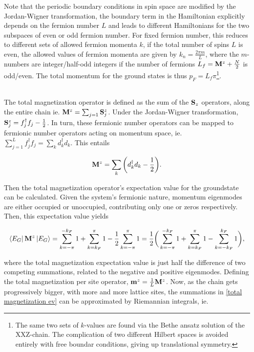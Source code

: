 \documentclass{homework}
\begin{document}
Note that the periodic boundary conditions in spin space are modified by the Jordan-Wigner transformation, the boundary term in the Hamiltonian explicitly depends on the fermion number $L$ and leads to different Hamiltonians for the two subspaces of even or odd fermion number. For fixed fermion number, this reduces to different sets of allowed fermion momenta $k$, if the total number of spins $L$ is even, the allowed values of fermion momenta are given by $k_n = \frac{2 \pi m}{L}$, where the $m$-numbers are integer/half-odd integers if the number of fermions $L_f = {\bf M}^z + \frac{N}{2}$ is odd/even. The total momentum for the ground states is thus $p_F = L_f \pi$\footnote{The same two sets of $k$-values are found via the Bethe ansatz solution of the XXZ-chain. The complication of two different Hilbert spaces is avoided entirely with free boundar conditions, giving up translational symmetry.}.

\blanky \\

The total magnetization operator is defined as the sum of the ${\bf S}_z$ operators, along the entire chain ie. ${\bf M}^z = \sum_{j=1} {\bf S}^z_j$. Under the Jordan-Wigner transformation, ${\bf S}^z_j = f_j^\dagger f_j - \frac{1}{2}$. In turn, these fermionic number operators can be mapped to fermionic number operators acting on momentum space, ie. $\sum_{j=1}^{L} f_j^\dagger f_j = \sum_k d_k^\dagger d_k$. This entails

\begin{equation}
    {\bf M}^z = \sum_{k} \bigg(d_k^\dagger d_k - \frac{1}{2}\bigg).
\end{equation}

Then the total magnetization operator's expectation value for the groundstate can be calculated. Given the system's fermionic nature, momentum eigenmodes are either occupied or unoccupied, contributing only one or zeros respectively. Then, this expectation value yields

\begin{equation}
    \bra{E_G} {{\bf M}^z} \ket{E_G} = \sum_{k=-\pi}^{-k_F} 1 + \sum_{k=k_F}^{\pi} 1 - \frac{1}{2} \sum_{k=-\pi}^{\pi} 1 \\
    = \frac{1}{2} \bigg( \sum_{k=-\pi}^{-k_F} 1 + \sum_{k=k_F}^{\pi} 1 - \sum_{k = -k_F}^{k_F} 1  \bigg), \label{total magnetization ev}
\end{equation}

where the total magnetization expectation value is just half the difference of two competing summations, related to the negative and positive eigenmodes. Defining the total magnetization per site operator, ${{\bf m}}^z = \frac{1}{L} {\bf M}^z$. Now, as the chain gets progressively bigger, with more and more lattice sites, the summations in \eqref{total magnetization ev} can be approximated by Riemannian integrals, ie.
\end{document}
